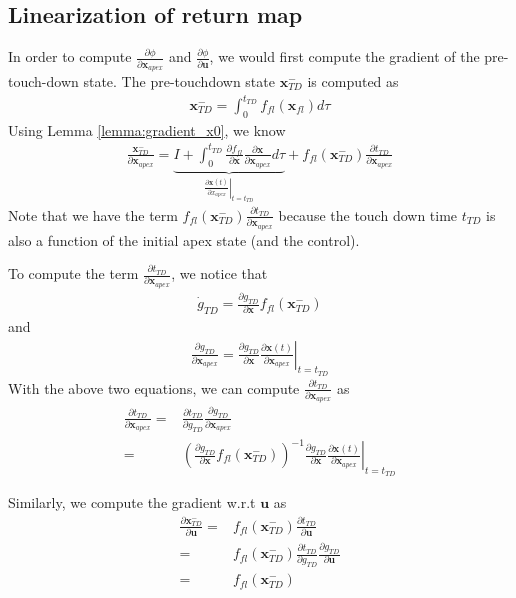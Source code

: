 \documentclass{article}
\begin{document}
\subsection{Linearization of return map}
In order to compute $\frac{\partial\phi}{\partial{\mathbf{x}}_{apex}}$ and $\frac{\partial\phi}{\partial \mathbf{u}}$, we would first compute the gradient of the pre-touch-down state. The pre-touchdown state $\mathbf{x}_{TD}^-$ is computed as
\begin{align}
	\mathbf{x}_{TD}^- = \int_0^{t_{TD}} f_{fl}(\mathbf{x}_{fl}) d\tau
\end{align}
Using Lemma \ref{lemma:gradient_x0}, we know
\begin{align}
	\frac{\mathbf{x}_{TD}^-}{\partial \mathbf{x}_{apex}} = \underbrace{I + \int_0^{t_{TD}} \frac{\partial f_{fl}}{\partial \mathbf{x}}\frac{\partial \mathbf{x}}{\partial \mathbf{x}_{apex}} d\tau}_{\left.\frac{\partial \mathbf{x}(t)}{\partial x_{apex}}\right|_{t=t_{TD}}} + f_{fl}(\mathbf{x}_{TD}^-)\frac{\partial t_{TD}}{\partial \mathbf{x}_{apex}}
\end{align}
Note that we have the term $f_{fl}(\mathbf{x}_{TD}^-)\frac{\partial t_{TD}}{\partial \mathbf{x}_{apex}}$ because the touch down time $t_{TD}$ is also a function of the initial apex state (and the control).

To compute the term $\frac{\partial t_{TD}}{\partial \mathbf{x}_{apex}}$, we notice that
\begin{align}
	\dot{g}_{TD} = \frac{\partial{g}_{TD}}{\partial \mathbf{x}}f_{fl}(\mathbf{x}_{TD}^-)
\end{align}
and 
\begin{align}
	\frac{\partial g_{TD}}{\partial \mathbf{x}_{apex}} = \frac{\partial g_{TD}}{\partial \mathbf{x}}\left.\frac{\partial \mathbf{x}(t)}{\partial \mathbf{x}_{apex}}\right|_{t = t_{TD}}
\end{align}
With the above two equations, we can compute $\frac{\partial t_{TD}}{\partial \mathbf{x}_{apex}}$ as
\begin{align}
	\frac{\partial t_{TD}}{\partial \mathbf{x}_{apex}} =& \frac{\partial t_{TD}}{\partial g_{TD}}\frac{\partial g_{TD}}{\partial \mathbf{x}_{apex}}\\
	=&\left(\frac{\partial{g}_{TD}}{\partial \mathbf{x}}f_{fl}(\mathbf{x}_{TD}^-)\right)^{-1}\frac{\partial g_{TD}}{\partial \mathbf{x}}\left.\frac{\partial \mathbf{x}(t)}{\partial \mathbf{x}_{apex}}\right|_{t = t_{TD}}
\end{align}

Similarly, we compute the gradient w.r.t $\mathbf{u}$ as
\begin{align}
	\frac{\partial \mathbf{x}_{TD}^-}{\partial \mathbf{u}} =& f_{fl}(\mathbf{x}_{TD}^-)\frac{\partial t_{TD}}{\partial \mathbf{u}}\\
	=&f_{fl}(\mathbf{x}_{TD}^-)\frac{\partial t_{TD}}{\partial g_{TD}}\frac{\partial g_{TD}}{\partial \mathbf{u}}\\
	=&f_{fl}(\mathbf{x}_{TD}^-)
\end{align}
\end{document}
